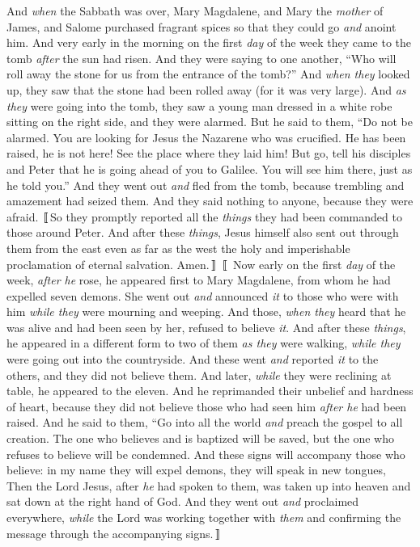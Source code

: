 \begin{biblechapter} %
 And \textit{when} the Sabbath was over, Mary Magdalene, and Mary the \textit{mother} of James, and Salome purchased fragrant spices so that they could go \textit{and} anoint him.
\verse And very early in the morning on the first \textit{day} of the week they came to the tomb \textit{after} the sun had risen.
\verse And they were saying to one another, “Who will roll away the stone for us from the entrance of the tomb?”
\verse And \textit{when they} looked up, they saw that the stone had been rolled away (for it was very large).
\verse And \textit{as they} were going into the tomb, they saw a young man dressed in a white robe sitting on the right side, and they were alarmed.
\verse But he said to them, “Do not be alarmed. You are looking for Jesus the Nazarene who was crucified. He has been raised, he is not here! See the place where they laid him!
\verse But go, tell his disciples and Peter that he is going ahead of you to Galilee. You will see him there, just as he told you.”
\verse And they went out \textit{and} fled from the tomb, because trembling and amazement had seized them. And they said nothing to anyone, because they were afraid. 〚So they promptly reported all the \textit{things} they had been commanded to those around Peter. And after these \textit{things}, Jesus himself also sent out through them from the east even as far as the west the holy and imperishable proclamation of eternal salvation. Amen.〛
 〚
\verse Now early on the first \textit{day} of the week, \textit{after he} rose, he appeared first to Mary Magdalene, from whom he had expelled seven demons.
\verse She went out \textit{and} announced \textit{it} to those who were with him \textit{while they} were mourning and weeping.
\verse And those, \textit{when they} heard that he was alive and had been seen by her, refused to believe \textit{it}.
\verse And after these \textit{things}, he appeared in a different form to two of them \textit{as they} were walking, \textit{while they} were going out into the countryside.
\verse And these went \textit{and} reported \textit{it} to the others, and they did not believe them.
\verse And later, \textit{while} they were reclining at table, he appeared to the eleven. And he reprimanded their unbelief and hardness of heart, because they did not believe those who had seen him \textit{after he} had been raised.
\verse And he said to them, “Go into all the world \textit{and} preach the gospel to all creation.
\verse The one who believes and is baptized will be saved, but the one who refuses to believe will be condemned.
\verse And these signs will accompany those who believe: in my name they will expel demons, they will speak in new tongues,
\verse Then the Lord Jesus, after \textit{he} had spoken to them, was taken up into heaven and sat down at the right hand of God.
\verse And they went out \textit{and} proclaimed everywhere, \textit{while} the Lord was working together with \textit{them} and confirming the message through the accompanying signs.〛
\end{biblechapter}

